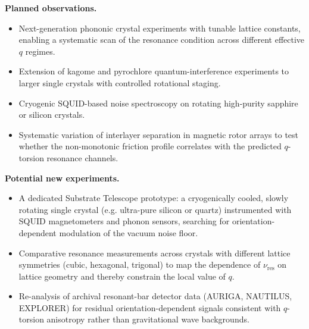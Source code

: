 \textbf{Planned observations.}

\begin{itemize}
  \item Next-generation phononic crystal experiments with tunable lattice constants, enabling a systematic scan of the resonance condition across different effective $q$ regimes.
  \item Extension of kagome and pyrochlore quantum-interference experiments to larger single crystals with controlled rotational staging.
  \item Cryogenic SQUID-based noise spectroscopy on rotating high-purity sapphire or silicon crystals.
  \item Systematic variation of interlayer separation in magnetic rotor arrays to test whether the non-monotonic friction profile correlates with the predicted $q$-torsion resonance channels.
\end{itemize}

\textbf{Potential new experiments.}

\begin{itemize}
  \item A dedicated Substrate Telescope prototype: a cryogenically cooled, slowly rotating single crystal (e.g. ultra-pure silicon or quartz) instrumented with SQUID magnetometers and phonon sensors, searching for orientation-dependent modulation of the vacuum noise floor.
  \item Comparative resonance measurements across crystals with different lattice symmetries (cubic, hexagonal, trigonal) to map the dependence of $\nu_{\mathrm{res}}$ on lattice geometry and thereby constrain the local value of $q$.
  \item Re-analysis of archival resonant-bar detector data (AURIGA, NAUTILUS, EXPLORER) for residual orientation-dependent signals consistent with $q$-torsion anisotropy rather than gravitational wave backgrounds.
\end{itemize}

